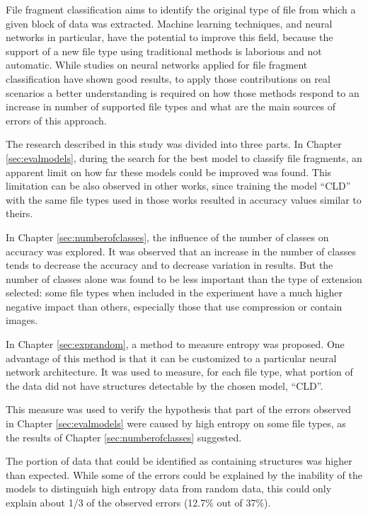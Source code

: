 
File fragment classification aims to identify the original type of file from which a given block of data was extracted. Machine learning techniques, and neural networks in particular, have the potential to improve this field, because the support of a new file type using traditional methods is laborious and not automatic. While studies on neural networks applied for file fragment classification have shown good results, to apply those contributions on real scenarios a better understanding is required on how those methods respond to an increase in number of supported file types and what are the main sources of errors of this approach.

The research described in this study was divided into three parts.
In Chapter \ref{sec:evalmodels}, during the search for the best model to classify file fragments, an apparent limit on how far these models could be improved was found. This limitation can be also observed in other works, since training the model ``CLD'' with the same file types used in those works resulted in accuracy values similar to theirs.

In Chapter \ref{sec:numberofclasses}, the influence of the number of classes on accuracy was explored. It was observed that an increase in the number of classes tends to decrease the accuracy and to decrease variation in results. But the number of classes alone was found to be less important than the type of extension selected: some file types when included in the experiment have a much higher negative impact than others, especially those that use compression or contain images.

In Chapter \ref{sec:exprandom}, a method to measure entropy was proposed. One advantage of this method is that it can be customized to a particular neural network architecture. It was used to measure, for each file type, what portion of the data did not have structures detectable by the chosen model, ``CLD''.

This measure was used to verify the hypothesis that part of the errors observed in Chapter \ref{sec:evalmodels} were caused by high entropy on some file types, as the results of Chapter  \ref{sec:numberofclasses} suggested.

The portion of data that could be identified as containing structures was higher than expected. While some of the errors could be explained by the inability of the models to distinguish  high entropy data from random data, this could only explain about 1/3 of the observed errors (12.7\% out of 37\%).

